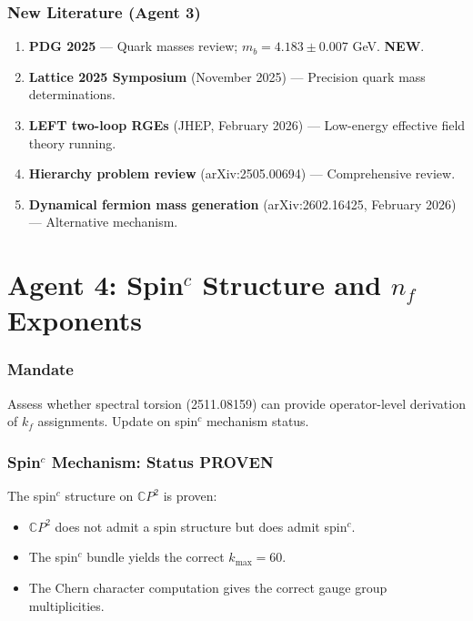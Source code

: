 \documentclass[11pt,a4paper]{article}
\newcommand{\NEW}{\textcolor{dfdblue}{\textbf{NEW}}}
\newcommand{\CP}{\mathbb{C}P}
\begin{document}
\section{New Literature (Agent 3)}

\begin{enumerate}
\item \textbf{PDG 2025} --- Quark masses review; $m_b = 4.183 \pm 0.007$ GeV. \NEW.
\item \textbf{Lattice 2025 Symposium} (November 2025) --- Precision quark mass determinations.
\item \textbf{LEFT two-loop RGEs} (JHEP, February 2026) --- Low-energy effective field theory running.
\item \textbf{Hierarchy problem review} (arXiv:2505.00694) --- Comprehensive review.
\item \textbf{Dynamical fermion mass generation} (arXiv:2602.16425, February 2026) --- Alternative mechanism.
\end{enumerate}


\part{Agent 4: Spin$^c$ Structure and $n_f$ Exponents}
\label{part:agent4}

\section{Mandate}

Assess whether spectral torsion (2511.08159) can provide operator-level derivation of $k_f$ assignments. Update on spin$^c$ mechanism status.

\section{Spin$^c$ Mechanism: Status PROVEN}

The spin$^c$ structure on $\CP^2$ is proven:
\begin{itemize}
\item $\CP^2$ does not admit a spin structure but does admit spin$^c$.
\item The spin$^c$ bundle yields the correct $k_{\max} = 60$.
\item The Chern character computation gives the correct gauge group multiplicities.
\end{itemize}
\end{document}
